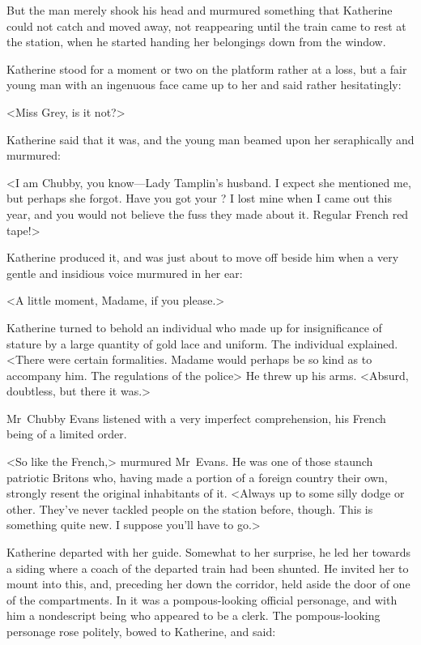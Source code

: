 But the man merely shook his head and murmured something that Katherine could not catch and moved away, not reappearing until the train came to rest at the station, when he started handing her belongings down from the window.

Katherine stood for a moment or two on the platform rather at a loss, but a fair young man with an ingenuous face came up to her and said rather hesitatingly:

<Miss Grey, is it not?>

Katherine said that it was, and the young man beamed upon her seraphically and murmured:

<I am Chubby, you know—Lady Tamplin's husband. I expect she mentioned me, but perhaps she forgot. Have you got your ? I lost mine when I came out this year, and you would not believe the fuss they made about it. Regular French red tape!>

Katherine produced it, and was just about to move off beside him when a very gentle and insidious voice murmured in her ear:

<A little moment, Madame, if you please.>

Katherine turned to behold an individual who made up for insignificance of stature by a large quantity of gold lace and uniform. The individual explained. <There were certain formalities. Madame would perhaps be so kind as to accompany him. The regulations of the police\longdash> He threw up his arms. <Absurd, doubtless, but there it was.>

Mr~Chubby Evans listened with a very imperfect comprehension, his French being of a limited order.

<So like the French,> murmured Mr~Evans. He was one of those staunch patriotic Britons who, having made a portion of a foreign country their own, strongly resent the original inhabitants of it. <Always up to some silly dodge or other. They've never tackled people on the station before, though. This is something quite new. I suppose you'll have to go.>

Katherine departed with her guide. Somewhat to her surprise, he led her towards a siding where a coach of the departed train had been shunted. He invited her to mount into this, and, preceding her down the corridor, held aside the door of one of the compartments. In it was a pompous-looking official personage, and with him a nondescript being who appeared to be a clerk. The pompous-looking personage rose politely, bowed to Katherine, and said:

